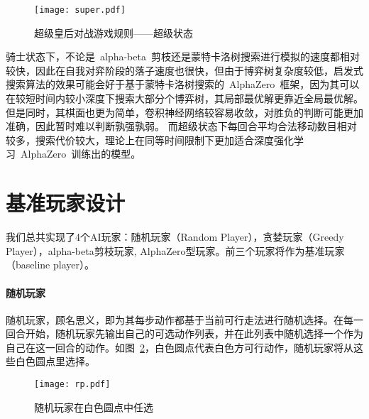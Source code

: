 \begin{figure}[htb]
    \centering
    \texttt{[image: super.pdf]}
    \caption[rules-super]{%
        超级皇后对战游戏规则——超级状态%
      }
    \label{fig:super}
\end{figure}
骑士状态下，不论是~alpha-beta~剪枝还是蒙特卡洛树搜索进行模拟的速度都相对较快，因此在自我对弈阶段的落子速度也很快，但由于博弈树复杂度较低，启发式搜索算法的效果可能会好于基于蒙特卡洛树搜索的~AlphaZero~框架，因为其可以在较短时间内较小深度下搜索大部分个博弈树，其局部最优解更靠近全局最优解。但是同时，其棋面也更为简单，卷积神经网络较容易收敛，对胜负的判断可能更加准确，因此暂时难以判断孰强孰弱。
而超级状态下每回合平均合法移动数目相对较多，搜索代价较大，理论上在同等时间限制下更加适合深度强化学习~AlphaZero~训练出的模型。

\section{基准玩家设计}
我们总共实现了4个AI玩家：随机玩家（Random Player），贪婪玩家（Greedy Player），alpha-beta剪枝玩家, AlphaZero型玩家。前三个玩家将作为基准玩家（baseline player）。
\paragraph{随机玩家}
随机玩家，顾名思义，即为其每步动作都基于当前可行走法进行随机选择。在每一回合开始，随机玩家先输出自己的可选动作列表，并在此列表中随机选择一个作为自己在这一回合的动作。如图~\ref{fig:super}，白色圆点代表白色方可行动作，随机玩家将从这些白色圆点里选择。
\begin{figure}[htb]
    \centering
    \texttt{[image: rp.pdf]}
    \caption[rp]{%
        随机玩家在白色圆点中任选%
      }
    \label{fig:super}
\end{figure}
